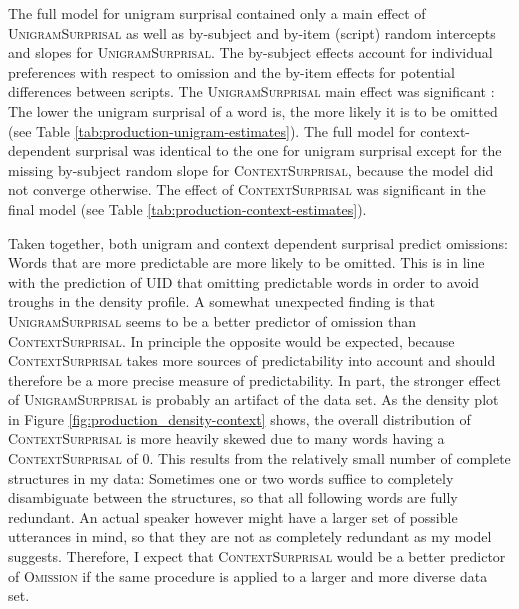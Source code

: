 The full model for unigram surprisal contained only a main effect of \textsc{UnigramSurprisal} as well as by-subject and by-item (script) random intercepts and slopes for \textsc{UnigramSurprisal}. The by-subject effects account for individual preferences with respect to omission and the by-item effects for potential differences between scripts. The \textsc{UnigramSurprisal} main effect was significant : The lower the unigram surprisal of a word is, the more likely it is to be omitted (see Table \ref{tab:production-unigram-estimates}). The full model for context-dependent surprisal was identical to the one for unigram surprisal except for the missing by-subject random slope for \textsc{ContextSurprisal}, because the model did not converge otherwise. The effect of \textsc{ContextSurprisal} was significant  in the final model (see Table \ref{tab:production-context-estimates}).

\newpage
\noindent Taken together, both unigram and context dependent surprisal predict omissions: Words that are more predictable are more likely to be omitted. This is in line with the prediction of UID that omitting predictable words in order to avoid troughs in the density profile. A somewhat unexpected finding is that \textsc{UnigramSurprisal} seems to be a better predictor of omission than \textsc{ContextSurprisal}. In principle the opposite would be expected, because \textsc{ContextSurprisal} takes more sources of predictability into account and should therefore be a more precise measure of predictability. In part, the stronger effect of \textsc{UnigramSurprisal} is probably an artifact of the data set. As the density plot in Figure \ref{fig:production_density-context} shows, the overall distribution of \textsc{ContextSurprisal} is more heavily skewed due to many words having a \textsc{ContextSurprisal} of 0. This results from the relatively small number of complete structures in my data: Sometimes one or two words suffice to completely disambiguate between the structures, so that all following words are fully redundant. An actual speaker however might have a larger set of possible utterances in mind, so that they are not as completely redundant as my model suggests. Therefore, I expect that \textsc{ContextSurprisal} would be a better predictor of \textsc{Omission} if the same procedure is applied to a larger and more diverse data set.

